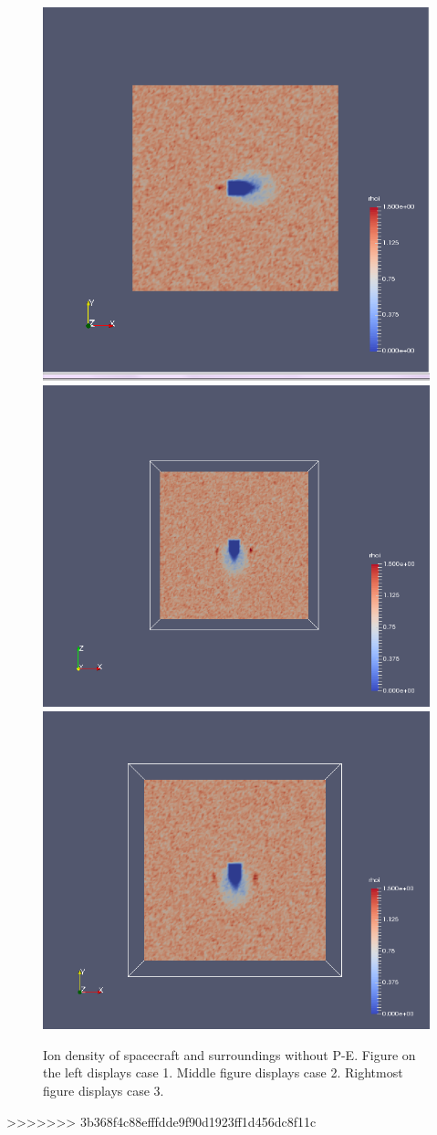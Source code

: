     \begin{figure}
        \includegraphics[width = 0.3 \textwidth]{images/ion density case1.png}
        \includegraphics[width = 0.3 \textwidth]{images/ion density x-z case2.png}
	 \includegraphics[width = 0.3 \textwidth]{images/ion density x-y case3.png}
        \caption{Ion density of spacecraft and surroundings without P-E. Figure on the left displays case 1. Middle figure displays case 2. Rightmost figure displays case 3.}
    \end{figure}
>>>>>>> 3b368f4c88efffdde9f90d1923ff1d456dc8f11c
